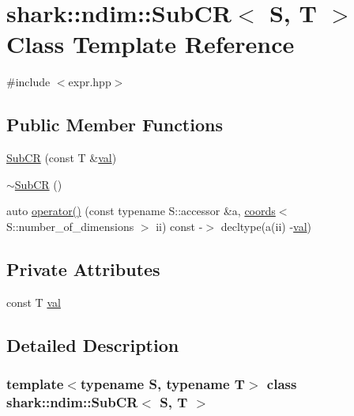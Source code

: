 \hypertarget{classshark_1_1ndim_1_1_sub_c_r}{}\section{shark\+:\+:ndim\+:\+:Sub\+CR$<$ S, T $>$ Class Template Reference}
\label{classshark_1_1ndim_1_1_sub_c_r}


{\ttfamily \#include $<$expr.\+hpp$>$}

\subsection*{Public Member Functions}
\begin{DoxyCompactItemize}
\item 
\hyperlink{classshark_1_1ndim_1_1_sub_c_r_a0fe42a1a8f9f2e0c8f8d6d86a6f359c9}{Sub\+CR} (const T \&\hyperlink{classshark_1_1ndim_1_1_sub_c_r_a4fe6be3ba612e66b26384ef24f389852}{val})
\item 
\hyperlink{classshark_1_1ndim_1_1_sub_c_r_a1252e990eb39e00dd074c13a178020af}{$\sim$\+Sub\+CR} ()
\item 
auto \hyperlink{classshark_1_1ndim_1_1_sub_c_r_a3b17c915ccc097280f935b41283798be}{operator()} (const typename S\+::accessor \&a, \hyperlink{structshark_1_1ndim_1_1coords}{coords}$<$ S\+::number\+\_\+of\+\_\+dimensions $>$ ii) const -\/$>$ decltype(a(ii) -\/\hyperlink{classshark_1_1ndim_1_1_sub_c_r_a4fe6be3ba612e66b26384ef24f389852}{val})
\end{DoxyCompactItemize}
\subsection*{Private Attributes}
\begin{DoxyCompactItemize}
\item 
const T \hyperlink{classshark_1_1ndim_1_1_sub_c_r_a4fe6be3ba612e66b26384ef24f389852}{val}
\end{DoxyCompactItemize}


\subsection{Detailed Description}
\subsubsection*{template$<$typename S, typename T$>$\newline
class shark\+::ndim\+::\+Sub\+C\+R$<$ S, T $>$}




